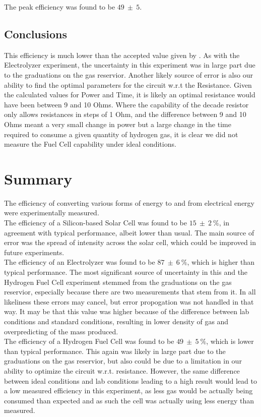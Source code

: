 \documentclass[aps,prl,reprint]{revtex4-2}
\begin{document}
The peak efficiency was found to be $49\ \pm\ 5$.

\subsection{Conclusions}

This efficiency is much lower than the accepted value given by \cite{Fuel Cell}.
As with the Electrolyzer experiment, the uncertainty in this experiment was in 
large part due to the graduations on the gas reservior. Another likely source of
error is also our ability to find the optimal parameters for the circuit w.r.t 
the Resistance. Given the calculated values for Power and Time, it is
likely an optimal resistance would have been between 9 and 10 Ohms. Where
the capability of the decade resistor only allows resistances in steps of 1 Ohm,
and the difference between 9 and 10 Ohms meant a very small change in power but 
a large change in the time required to consume a given quantity of hydrogen gas,
it is clear we did not measure the Fuel Cell capability under ideal conditions.


\section{Summary}

The efficiency of converting various forms of energy to and from 
electrical energy were experimentally measured. \\
The efficiency of a
Silicon-based Solar Cell was found to be $15\ \pm\ 2\ \%$, in agreement
with typical performance, albeit lower than usual. The main source of error
was the spread of intensity across the solar cell, which could be improved
in future experiments.\\

The efficiency of an Electrolyzer was found to
be $87\ \pm\ 6\ \%$, which is higher than typical performance. The most 
significant source of uncertainty in this and the Hydrogen Fuel Cell experiment
stemmed from the graduations on the gas reservior, especially because there
are two measurements that stem from it. In all likeliness these errors may 
cancel, but error propogation was not handled in that way. It may be that this
value was higher because of the difference between lab conditions and standard
conditions, resulting in lower density of gas and overpredicting of the mass 
produced. \\

The efficiency of a Hydrogen Fuel Cell was found to be $49\ \pm\ 5\ \%$,
which is lower than typical performance. This again was likely in large part
due to the graduations on the gas reservior, but also could be due to a 
limitation in our ability to optimize the circuit w.r.t. resistance. 
However, the same difference between ideal conditions and lab conditions 
leading to a high result would lead to a low measured efficiency in this 
experiment, as less gas would be actually being consumed than expected and as 
such the cell was actually using less energy than measured.
\end{document}
